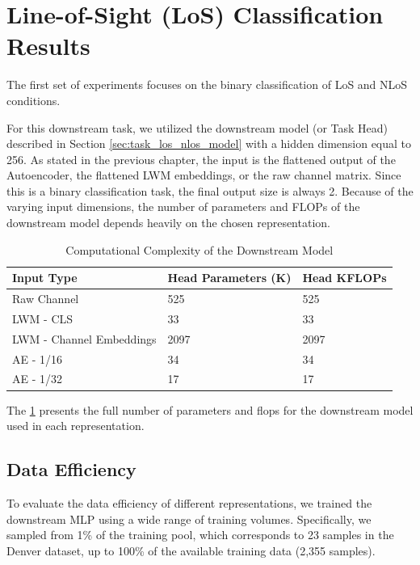 \section{Line-of-Sight (LoS) Classification Results}\label{sec:experiments_los_nlos}

The first set of experiments focuses on the binary classification of LoS and NLoS conditions.

For this downstream task, we utilized the downstream model (or Task Head) described in Section \ref{sec:task_los_nlos_model} with a hidden dimension equal to 256. As stated in the previous chapter, the input is the flattened output of the Autoencoder, the flattened LWM embeddings, or the raw channel matrix. Since this is a binary classification task, the final output size is always 2. Because of the varying input dimensions, the number of parameters and FLOPs of the downstream model depends heavily on the chosen representation.

\begin{table}[htbp]
    \centering
    \caption{Computational Complexity of the Downstream Model}
    \label{tab:los_nlos_model_complexity}
    \begin{tabular}{lll}
        \hline
        \textbf{Input Type} & \textbf{Head Parameters (K)} & \textbf{Head KFLOPs} \\
        \hline
        Raw Channel & 525 & 525 \\
        LWM - CLS & 33 & 33 \\
        LWM - Channel Embeddings & 2097 & 2097 \\
        AE - 1/16 & 34 & 34 \\
        AE - 1/32 & 17 & 17 \\
        \hline
    \end{tabular}
\end{table}

The \ref{tab:los_nlos_model_complexity} presents the full number of parameters and flops for the downstream model used in each representation.

\subsection{Data Efficiency}\label{sec:experiments_los_nlos_data_eff}

To evaluate the data efficiency of different representations, we trained the downstream MLP using a wide range of training volumes. Specifically, we sampled from 1\% of the training pool, which corresponds to 23 samples in the Denver dataset, up to 100\% of the available training data (2,355 samples).

